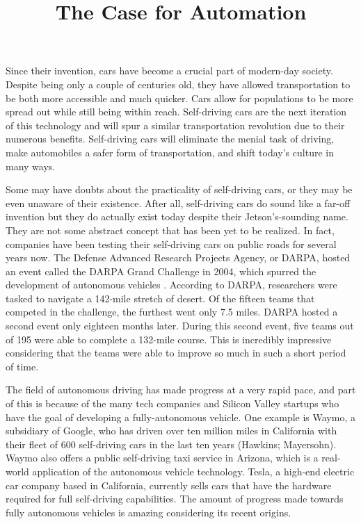 \documentclass{mla}
\title{The Case for Automation}
\begin{document}
\makeheader

Since their invention, cars have become a crucial part of modern-day society. Despite being only a couple of centuries old, they have allowed transportation to be both more accessible and much quicker. Cars allow for populations to be more spread out  while still being within reach. Self-driving cars are the next iteration of this technology and will spur a similar transportation revolution due to their numerous benefits. Self-driving cars will eliminate the menial task of driving, make automobiles a safer form of transportation, and shift today's culture in many ways.

Some may have doubts about the practicality of self-driving cars, or they may be even unaware of their existence. After all, self-driving cars do sound like a far-off invention but they do actually exist today despite their Jetson's-sounding name. They are not some abstract concept that has been yet to be realized. In fact, companies have been testing their self-driving cars on public roads for several years now. The Defense Advanced Research Projects Agency, or DARPA, hosted an event called the DARPA Grand Challenge in 2004, which spurred the development of autonomous vehicles \cite{DARPA2014}. According to DARPA, researchers were tasked to navigate a 142-mile stretch of desert. Of the fifteen teams that competed in the challenge, the furthest went only 7.5 miles. DARPA hosted a second event only eighteen months later. During this second event, five teams out of 195 were able to complete a 132-mile course. This is incredibly impressive considering that the teams were able to improve so much in such a short period of time.

The field of autonomous driving has made progress at a very rapid pace, and part of this is because of the many tech companies and Silicon Valley startups who have the goal of developing a fully-autonomous vehicle. One example is Waymo, a subsidiary of Google, who has driven over ten million miles in California with their fleet of 600 self-driving cars in the last ten years (Hawkins; Mayersohn). Waymo also offers a public self-driving taxi service in Arizona, which is a real-world application of the autonomous vehicle technology. Tesla, a high-end electric car company based in California, currently sells cars that have the hardware required for full self-driving capabilities. The amount of progress made towards fully autonomous vehicles is amazing considering its recent origins.
\end{document}

